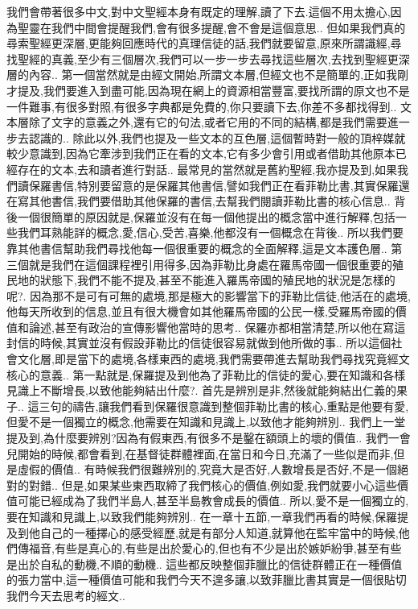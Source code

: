 \documentclass{book}
\begin{document}
我們會帶著很多中文,對中文聖經本身有既定的理解,讀了下去.這個不用太擔心,因為聖靈在我們中間會提醒我們,會有很多提醒,會不會是這個意思..
但如果我們真的尋索聖經更深層,更能夠回應時代的真理信徒的話,我們就要留意,原來所謂識經,尋找聖經的真義,至少有三個層次,我們可以一步一步去尋找這些層次,去找到聖經更深層的內容..
第一個當然就是由經文開始,所謂文本層,但經文也不是簡單的,正如我剛才提及,我們要進入到盡可能,因為現在網上的資源相當豐富,要找所謂的原文也不是一件難事,有很多對照,有很多字典都是免費的,你只要讀下去,你差不多都找得到..
文本層除了文字的意義之外,還有它的句法,或者它用的不同的結構,都是我們需要進一步去認識的..
除此以外,我們也提及一些文本的互色層,這個暫時對一般的頂梓媒就較少意識到,因為它牽涉到我們正在看的文本,它有多少會引用或者借助其他原本已經存在的文本,去和讀者進行對話..
最常見的當然就是舊約聖經,我亦提及到,如果我們讀保羅書信,特別要留意的是保羅其他書信,譬如我們正在看菲勒比書,其實保羅還在寫其他書信,我們要借助其他保羅的書信,去幫我們閱讀菲勒比書的核心信息..
背後一個很簡單的原因就是,保羅並沒有在每一個他提出的概念當中進行解釋,包括一些我們耳熟能詳的概念,愛,信心,受苦,喜樂,他都沒有一個概念在背後..
所以我們要靠其他書信幫助我們尋找他每一個很重要的概念的全面解釋,這是文本護色層..
第三個就是我們在這個課程裡引用得多,因為菲勒比身處在羅馬帝國一個很重要的殖民地的狀態下,我們不能不提及,甚至不能進入羅馬帝國的殖民地的狀況是怎樣的呢?.
因為那不是可有可無的處境,那是極大的影響當下的菲勒比信徒,他活在的處境,他每天所收到的信息,並且有很大機會如其他羅馬帝國的公民一樣,受羅馬帝國的價值和論述,甚至有政治的宣傳影響他當時的思考..
保羅亦都相當清楚,所以他在寫這封信的時候,其實並沒有假設菲勒比的信徒很容易就做到他所做的事..
所以這個社會文化層,即是當下的處境,各樣東西的處境,我們需要帶進去幫助我們尋找究竟經文核心的意義..
第一點就是,保羅提及到他為了菲勒比的信徒的愛心,要在知識和各樣見識上不斷增長,以致他能夠結出什麼?.
首先是辨別是非,然後就能夠結出仁義的果子..
這三句的禱告,讓我們看到保羅很意識到整個菲勒比書的核心,重點是他要有愛,但愛不是一個獨立的概念,他需要在知識和見識上,以致他才能夠辨別..
我們上一堂提及到,為什麼要辨別?因為有假東西,有很多不是鑿在額頭上的壞的價值..
我們一會兒開始的時候,都會看到,在基督徒群體裡面,在當日和今日,充滿了一些似是而非,但是虛假的價值..
有時候我們很難辨別的,究竟大是否好,人數增長是否好,不是一個絕對的對錯..
但是,如果某些東西取締了我們核心的價值,例如愛,我們就要小心這些價值可能已經成為了我們半島人,甚至半島教會成長的價值..
所以,愛不是一個獨立的,要在知識和見識上,以致我們能夠辨別..
在一章十五節,一章我們再看的時候,保羅提及到他自己的一種擇心的感受經歷,就是有部分人知道,就算他在監牢當中的時候,他們傳福音,有些是真心的,有些是出於愛心的,但也有不少是出於嫉妒紛爭,甚至有些是出於自私的動機,不順的動機..
這些都反映整個菲臘比的信徒群體正在一種價值的張力當中,這一種價值可能和我們今天不遑多讓,以致菲臘比書其實是一個很貼切我們今天去思考的經文..
\end{document}
